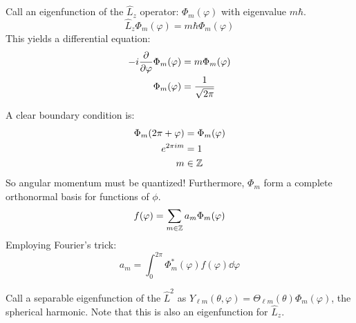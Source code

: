 Call an eigenfunction of the $\hat{L}_z$ operator: $\Phi_m(\varphi)$ with eigenvalue $m \hbar$.
\[ \hat{L}_z \Phi_m(\varphi) = m \hbar \Phi_m(\varphi) \]
This yields a differential equation:
\begin{align*}
    -i \pdv{}{\varphi} \Phi_m(\varphi) &= m \Phi_m(\varphi) \\
    \Phi_m(\varphi) &= \frac{1}{\sqrt{2\pi}}
\end{align*}

A clear boundary condition is:
\begin{align*}
    \Phi_m(2\pi + \varphi) &= \Phi_m(\varphi) \\
    e^{2\pi i m} &= 1 \\
    m &\in \operatorname{\mathbb{Z}}
\end{align*}
So angular momentum must be quantized! Furthermore, $\Phi_m$ form a complete orthonormal basis for functions of $\phi$.
\[ f(\varphi) = \sum_{m \in \operatorname{\mathbb{Z}}} a_m \Phi_m(\varphi) \]
Employing Fourier's trick:
\[ a_m = \int_{0}^{2\pi} \Phi_{m}^* (\varphi) f(\varphi) \dd{\varphi} \]

Call a separable eigenfunction of the $\hat{L}^2$ as $Y_{\ell m}(\theta, \varphi) = \Theta_{\ell m}(\theta) \Phi_m(\varphi)$, the spherical harmonic. Note that this is
also an eigenfunction for $\hat{L}_z$.

